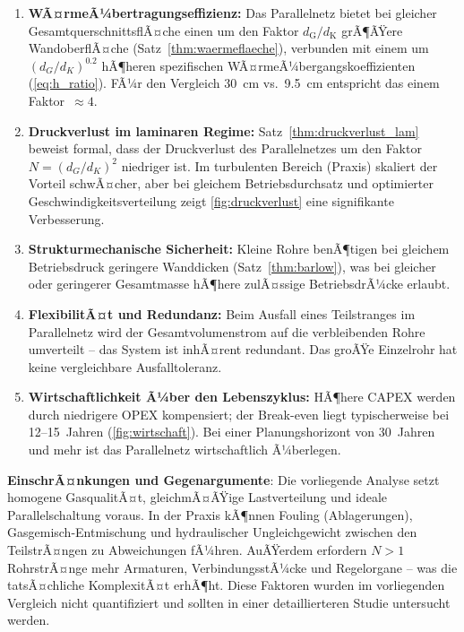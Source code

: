 ﻿\documentclass[12pt,a4paper,twoside]{article}
\theoremstyle{plain}
\theoremstyle{definition}
\theoremstyle{remark}
\newcommand{\dG}{d_{\mathrm{G}}}
\newcommand{\dK}{d_{\mathrm{K}}}
\begin{document}
\begin{enumerate}[label=\textbf{(\arabic*)}, leftmargin=2.5em]
  \item \textbf{WÃ¤rmeÃ¼bertragungseffizienz:}
        Das Parallelnetz bietet bei gleicher GesamtquerschnittsflÃ¤che einen
        um den Faktor $\dG/\dK$ grÃ¶ÃŸere WandoberflÃ¤che (Satz~\ref{thm:waermeflaeche}),
        verbunden mit einem um $(d_G/d_K)^{0.2}$ hÃ¶heren spezifischen
        WÃ¤rmeÃ¼bergangskoeffizienten (\cref{eq:h_ratio}).
        FÃ¼r den Vergleich \SI{30}{\centi\metre} vs.\ \SI{9.5}{\centi\metre}
        entspricht das einem Faktor~$\approx 4$.

  \item \textbf{Druckverlust im laminaren Regime:}
        Satz~\ref{thm:druckverlust_lam} beweist formal, dass der
        Druckverlust des Parallelnetzes um den Faktor $N = (d_G/d_K)^2$ niedriger
        ist. Im turbulenten Bereich (Praxis) skaliert der Vorteil schwÃ¤cher, aber
        bei gleichem Betriebsdurchsatz und optimierter Geschwindigkeitsverteilung
        zeigt \cref{fig:druckverlust} eine signifikante Verbesserung.

  \item \textbf{Strukturmechanische Sicherheit:}
        Kleine Rohre benÃ¶tigen bei gleichem Betriebsdruck geringere Wanddicken
        (Satz~\ref{thm:barlow}), was bei gleicher oder geringerer Gesamtmasse
        hÃ¶here zulÃ¤ssige BetriebsdrÃ¼cke erlaubt.

  \item \textbf{FlexibilitÃ¤t und Redundanz:}
        Beim Ausfall eines Teilstranges im Parallelnetz wird der
        Gesamtvolumenstrom auf die verbleibenden Rohre umverteilt -- das System
        ist inhÃ¤rent redundant.
        Das groÃŸe Einzelrohr hat keine vergleichbare Ausfalltoleranz.

  \item \textbf{Wirtschaftlichkeit Ã¼ber den Lebenszyklus:}
        HÃ¶here CAPEX werden durch niedrigere OPEX kompensiert; der Break-even
        liegt typischerweise bei 12--15~Jahren (\cref{fig:wirtschaft}).
        Bei einer Planungshorizont von 30~Jahren und mehr ist das Parallelnetz
        wirtschaftlich Ã¼berlegen.
\end{enumerate}

\noindent
\textbf{EinschrÃ¤nkungen und Gegenargumente}: Die vorliegende Analyse
setzt homogene GasqualitÃ¤t, gleichmÃ¤ÃŸige Lastverteilung und ideale
Parallelschaltung voraus.
In der Praxis kÃ¶nnen Fouling (Ablagerungen), Gas\-gemisch-Entmischung und
hydraulischer Ungleichgewicht zwischen den TeilstrÃ¤ngen zu Abweichungen fÃ¼hren.
AuÃŸerdem erfordern $N > 1$ RohrstrÃ¤nge mehr Armaturen, VerbindungsstÃ¼cke und
Regelorgane -- was die tatsÃ¤chliche KomplexitÃ¤t erhÃ¶ht.
Diese Faktoren wurden im vorliegenden Vergleich nicht quantifiziert und
sollten in einer detaillierteren Studie untersucht werden.
\end{document}
